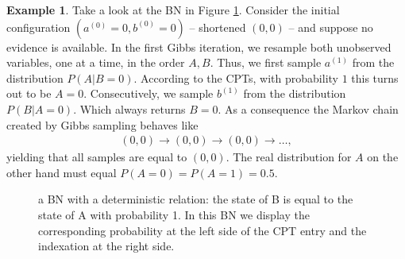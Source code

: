 \documentclass[a4paper, twoside, 11pt]{report}
\theoremstyle{plain}
\theoremstyle{definition}
\newtheorem{example}[thm]{Example}
\theoremstyle{remark}
\begin{document}
\begin{example}\label{ex:gibbs}
Take a look at the BN in Figure \ref{gibbs}. Consider the initial configuration $(a^{(0)} = 0, b^{(0)} = 0)$ -- shortened $(0,0)$ -- and suppose no evidence is available. 
In the first Gibbs iteration, we resample both unobserved variables, one at a time, in the order $A, B$. Thus, we first sample $a^{(1)}$ from the distribution $P(A | B = 0)$. According to the CPTs, with probability $1$ this turns out to be $A=0$. Consecutively, we sample $b^{(1)}$ from the distribution $P(B | A = 0 )$. Which always returns $B = 0$. As a consequence the Markov chain created by Gibbs sampling behaves like
\begin{align*}\label{gibbs-trap}
(0,0) \to (0,0) \to (0,0) \to \ldots ,
\end{align*}
yielding that all samples are equal to $(0,0)$. The real distribution for $A$ on the other hand must equal $P(A=0) = P(A=1) = 0.5$.
\end{example}\begin{center}
\begin{figure}
\centering
{}
\caption{a BN with a deterministic relation: the state of B is equal to the state of A with probability 1. In this BN we display the corresponding probability at the left side of the CPT entry and the indexation at the right side.}
\label{gibbs}
\end{figure}
\end{center}
\end{document}
